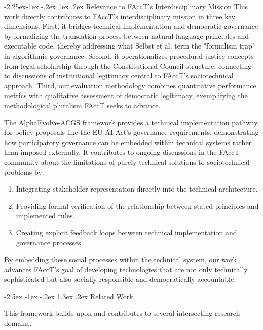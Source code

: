 \documentclass[manuscript,screen,review,anonymous,9pt]{acmart}
\makeatletter
\renewcommand\section{\@startsection{section}{1}{\z@}%
  {-2.5ex \@plus -1ex \@minus -.2ex}%
  {1.3ex \@plus.2ex}%
  {\normalfont\Large\bfseries}}
\renewcommand\subsection{\@startsection{subsection}{2}{\z@}%
  {-2.25ex\@plus -1ex \@minus -.2ex}%
  {1ex \@plus .2ex}%
  {\normalfont\large\bfseries}}
\makeatother
\begin{document}
\subsection{Relevance to FAccT's Interdisciplinary Mission}
\label{subsec:facct_relevance}
This work directly contributes to FAccT's interdisciplinary mission in three key dimensions. First, it bridges technical implementation and democratic governance by formalizing the translation process between natural language principles and executable code, thereby addressing what Selbst et al. \cite{Selbst2019FairnessAccountability} term the "formalism trap" in algorithmic governance. Second, it operationalizes procedural justice concepts from legal scholarship through the Constitutional Council structure, connecting to discussions of institutional legitimacy central to FAccT's sociotechnical approach. Third, our evaluation methodology combines quantitative performance metrics with qualitative assessment of democratic legitimacy, exemplifying the methodological pluralism FAccT seeks to advance.

The AlphaEvolve-ACGS framework provides a technical implementation pathway for policy proposals like the EU AI Act's governance requirements, demonstrating how participatory governance can be embedded within technical systems rather than imposed externally. It contributes to ongoing discussions in the FAccT community about the limitations of purely technical solutions to sociotechnical problems by:
\begin{enumerate}[leftmargin=*,itemsep=1pt,parsep=1pt]
    \item Integrating stakeholder representation directly into the technical architecture.
    \item Providing formal verification of the relationship between stated principles and implemented rules.
    \item Creating explicit feedback loops between technical implementation and governance processes.
\end{enumerate}
By embedding these social processes within the technical system, our work advances FAccT's goal of developing technologies that are not only technically sophisticated but also socially responsible and democratically accountable.

\section{Related Work}
\label{sec:related_work}

This framework builds upon and contributes to several intersecting research domains.
\end{document}
